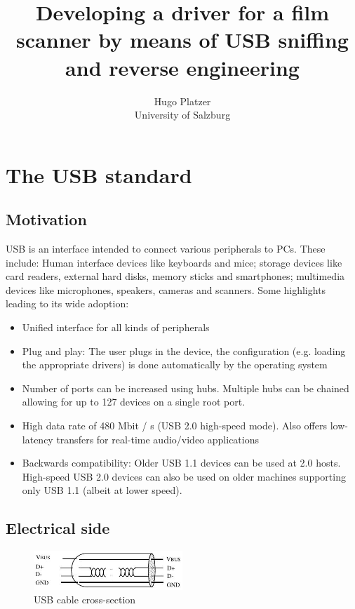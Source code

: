 \documentclass{article}
\begin{document}
\title{Developing a driver for a film scanner by means of USB sniffing and reverse engineering}
\author{Hugo Platzer \\ University of Salzburg}
\maketitle

\section{The USB standard}

\subsection{Motivation}

USB is an interface intended to connect various peripherals to PCs. These include:
Human interface devices like keyboards and mice; storage devices like card readers,
external hard disks, memory sticks and smartphones; multimedia devices like microphones, speakers,
cameras and scanners. Some highlights leading to its wide adoption:

\begin{itemize}
  \item Unified interface for all kinds of peripherals
  \item Plug and play: The user plugs in the device, the configuration (e.g. loading the appropriate drivers)
  is done automatically by the operating system
  \item Number of ports can be increased using hubs. Multiple hubs can be chained
        allowing for up to 127 devices on a single root port.
  \item High data rate of 480 Mbit / s (USB 2.0 high-speed mode). Also offers low-latency
        transfers for real-time audio/video applications
  \item Backwards compatibility: Older USB 1.1 devices can be used at 2.0 hosts.
        High-speed USB 2.0 devices can also be used on older
        machines supporting only USB 1.1 (albeit at lower speed).
\end{itemize}

\subsection{Electrical side}

\begin{figure}[!htbp]
  \caption{USB cable cross-section}
  \centering
  \includegraphics[width=0.5\textwidth]{images/usb_cable.jpg}
\end{figure}
\end{document}
